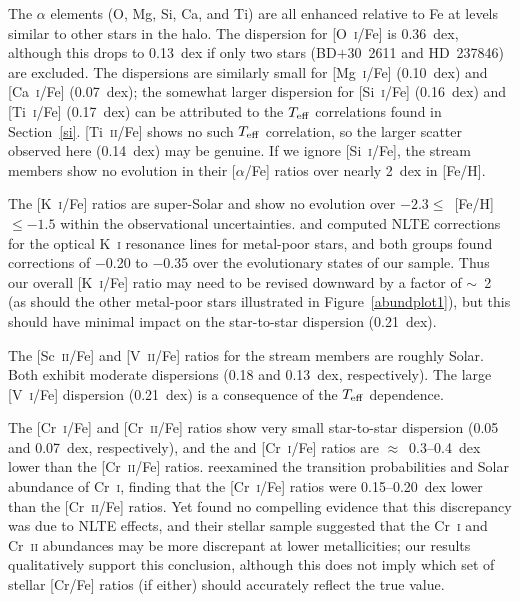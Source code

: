 \documentclass{emulateapj}
\begin{document}
The $\alpha$ elements (O, Mg, Si, Ca, and Ti) 
are all enhanced relative to Fe at levels similar to other stars 
in the halo.
The dispersion for [O~\textsc{i}/Fe] is 0.36~dex,
although this drops to 0.13~dex if only two stars (\mbox{BD$+$30~2611} 
and \mbox{HD~237846}) are excluded.
The dispersions are similarly small for 
[Mg~\textsc{i}/Fe] (0.10~dex) and 
[Ca~\textsc{i}/Fe] (0.07~dex);
the somewhat larger
dispersion for [Si~\textsc{i}/Fe] (0.16~dex)
and [Ti~\textsc{i}/Fe] (0.17~dex)
can be attributed to the $T_{\rm eff}$ correlations found in
Section~\ref{si}.
[Ti~\textsc{ii}/Fe] shows no such $T_{\rm eff}$ correlation,
so the larger scatter observed here (0.14~dex) may be genuine.
If we ignore [Si~\textsc{i}/Fe],
the stream members show no evolution in their [$\alpha$/Fe] ratios
over nearly 2~dex in [Fe/H].

The [K~\textsc{i}/Fe] ratios are super-Solar and show
no evolution over $-2.3 \leq$~[Fe/H]~$\leq -1.5$ within
the observational uncertainties.
\citet{ivanova00} and \citet{takeda09} computed 
NLTE corrections for the optical K~\textsc{i} resonance lines 
for metal-poor stars, and both groups found 
corrections of $-$0.20 to $-$0.35 over the evolutionary states
of our sample.
Thus our overall [K~\textsc{i}/Fe] ratio may need to be revised
downward by a factor of $\sim$~2 (as should the other metal-poor
stars illustrated in Figure~\ref{abundplot1}), 
but this should have minimal impact on the star-to-star dispersion
(0.21~dex).

The [Sc~\textsc{ii}/Fe] and [V~\textsc{ii}/Fe] ratios for the
stream members are roughly Solar.
Both exhibit moderate dispersions
(0.18 and 0.13~dex, respectively).
The large [V~\textsc{i}/Fe] dispersion (0.21~dex) is a consequence of the
$T_{\rm eff}$ dependence.

The [Cr~\textsc{i}/Fe] and [Cr~\textsc{ii}/Fe]
ratios show very small star-to-star dispersion
(0.05 and 0.07~dex, respectively),
and the and [Cr~\textsc{i}/Fe] ratios are $\approx$~0.3--0.4~dex
lower than the [Cr~\textsc{ii}/Fe] ratios.
\citet{sobeck07} reexamined the transition probabilities and
Solar abundance of Cr~\textsc{i}, finding that the 
[Cr~\textsc{i}/Fe] ratios were 0.15--0.20~dex lower than the
[Cr~\textsc{ii}/Fe] ratios.
Yet \citet{sobeck07} found no compelling evidence
that this discrepancy was due to NLTE effects, and 
their stellar sample suggested that the Cr~\textsc{i} and 
Cr~\textsc{ii} abundances may be more discrepant at lower metallicities;
our results qualitatively support this conclusion,
although this does not imply which set of stellar [Cr/Fe] ratios
(if either) should accurately reflect the true value.
\end{document}
